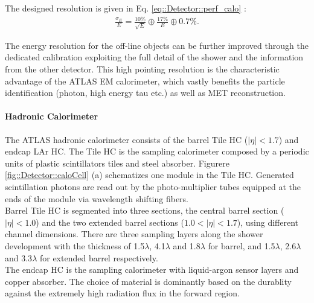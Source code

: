 

The designed resolution is given in Eq. \ref{eq::Detector::perf_calo} \cite{ATLAS_LAr_TDR}:
\begin{align}
\frac{\sigma_E}{E} = \frac{10\%}{\sqrt{E}} \oplus \frac{17\%}{E} \oplus 0.7\%.
\label{eq::Detector::perf_calo}
\end{align}

The energy resolution for the off-line objects can be further improved through the dedicated calibration exploiting the full detail of the shower and the information from the other detector. 
This high pointing resolution is the characteristic advantage of the ATLAS EM calorimeter, which vastly benefits the particle identification (photon, high energy tau etc.) as well as MET reconstruction. \\



\paragraph{Hadronic Calorimeter}
The ATLAS hadronic calorimeter consists of the barrel Tile HC ($|\eta|<1.7$) and endcap LAr HC.
The Tile HC is the sampling calorimeter composed by a periodic units of plastic scintillators tiles and steel absorber.
Figurere \ref{fig::Detector::caloCell} (a) schematizes one module in the Tile HC. Generated scintillation photons are read out by the photo-multiplier tubes equipped at the ends of the module via wavelength shifting fibers.  \\

Barrel Tile HC is segmented into three sections, the central barrel section ($|\eta|<1.0$) and the two extended barrel sections ($1.0<|\eta|<1.7$), using different channel dimensions. There are three sampling layers along the shower development with the thickness of 1.5$\lambda$, 4.1$\lambda$ and 1.8$\lambda$ for barrel, and 1.5$\lambda$, 2.6$\lambda$ and 3.3$\lambda$ for extended barrel respectively. \\

The endcap HC is the sampling calorimeter with liquid-argon sensor layers and copper absorber. The choice of material is dominantly based on the durablity against the extremely high radiation flux in the forward region.


